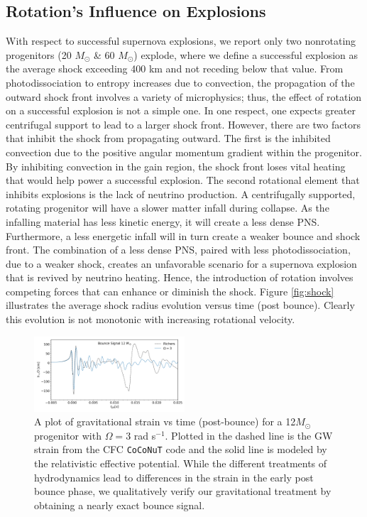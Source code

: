 \documentclass[twocolumn,times]{aastex62}  %
\begin{document}
\subsection{Rotation's Influence on Explosions}
\par With respect to successful supernova explosions, we report only two nonrotating progenitors (20 $M_\odot$ \& 60 $M_\odot$) explode, where we define a successful explosion as the average shock exceeding 400 km and not receding below that value.  From photodissociation to entropy increases due to convection, the propagation of the outward shock front involves a variety of microphysics; thus, the effect of rotation on a successful explosion is not a simple one.  In one respect, one expects greater centrifugal support to lead to a larger shock front.  However, there are two factors that inhibit the shock from propagating outward.  The first is the inhibited convection due to the positive angular momentum gradient within the progenitor.  By inhibiting convection in the gain region, the shock front loses vital heating that would help power a successful explosion.  The  second rotational element that inhibits explosions is the lack of neutrino production.  A centrifugally supported, rotating progenitor will have a slower matter infall during collapse.  As the infalling material has less kinetic energy, it will create a less dense PNS.  Furthermore, a less energetic infall will in turn create a weaker bounce and shock front.  The combination of a less dense PNS, paired with less photodissociation, due to a weaker shock, creates an unfavorable scenario for a supernova explosion that is revived by neutrino heating.  Hence, the introduction of rotation involves competing forces that can enhance or diminish the shock.  Figure \ref{fig:shock} illustrates the average shock radius evolution versus time (post bounce). Clearly this evolution is not monotonic with increasing rotational velocity.

 \begin{figure}[t]
    \centering
    \includegraphics[width=0.5\textwidth]{figures/bounce_richers_final.png}
    \caption{A plot of gravitational strain vs time (post-bounce) for a 12\(M_\odot\) progenitor with $\Omega = 3$ rad s$^{-1}$.  Plotted in the dashed line is the GW strain from the CFC \texttt{CoCoNuT} code and the solid line is modeled by the relativistic effective potential.  While the different treatments of hydrodynamics lead to differences in the strain in the early post bounce phase, we qualitatively verify our gravitational treatment by obtaining a nearly exact bounce signal. }
    \label{fig:bounce_cfc}
\end{figure}
\end{document}
